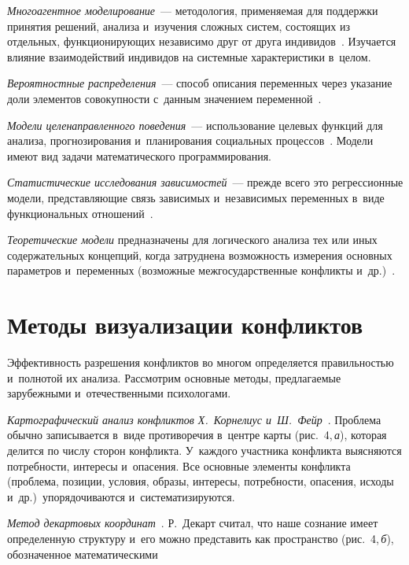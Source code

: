 \begin{multicols}{2}
  \textit{Многоагентное моделирование}~--- методология, 
применяемая для поддержки принятия решений, анализа и~изучения сложных 
сис\-тем, со\-сто\-ящих из отдельных, функционирующих независимо друг от друга 
индивидов~\cite{16-r}. Изучается влияние взаимодействий индивидов на сис\-тем\-ные 
характеристики в~целом.
  
  \textit{Вероятностные распределения}~--- способ описания 
переменных через указание доли элементов совокупности с~данным значением 
переменной~\cite{17-r}.
  
  \textit{Модели целенаправленного поведения}~--- использование 
целевых функций для анализа, прогнозирования и~планирования социальных 
процессов~\cite{18-r}. Модели имеют вид задачи математического программирования.
  
  \textit{Статистические исследования зависимостей}~--- прежде 
всего это регрессионные модели, пред\-став\-ля\-ющие связь зависимых 
и~независимых переменных в~виде функциональных отношений~\cite{19-r}.
  
  \textit{Теоретические модели} предназначены для логического 
анализа тех или иных содержательных концепций, когда затруднена 
возможность измерения основных параметров и~переменных (возможные 
межгосударственные конфликты и~др.)~\cite{17-r}.
  
\section{Методы визуализации конфликтов }

  Эффективность разрешения конфликтов во многом определяется 
правильностью и~полнотой их анализа. Рассмотрим основные методы, 
пред\-ла\-га\-емые зарубежными и~отечественными психологами.
  
  \textit{Картографический анализ конфликтов  
Х.~Кор\-не\-ли\-ус и~Ш.~Фейр}~\cite{20-r}. Проблема обычно записывается в~виде 
противоречия в~центре карты (рис.~4,\,\textit{а}), которая делится по числу 
сторон конфликта. У~каж\-до\-го участника конфликта выясняются потребности, 
интересы и~опасения. Все основные элементы конфликта (проблема, позиции, 
условия, образы, интересы, потребности, опасения, исходы и~др.)\ 
упорядочиваются и~систематизируются. 
  
  \textit{Метод декартовых координат}~\cite{21-r}. Р.~Декарт считал, что 
наше сознание имеет определенную структуру и~его можно пред\-ста\-вить как 
про\-стран\-ст\-во (рис.~4,\,\textit{б}), обозначенное математическими\linebreak\vspace*{-12pt}

\pagebreak

\end{multicols}

